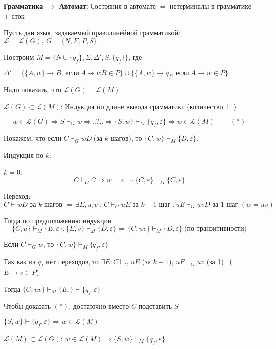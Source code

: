\Proof \textbf{Грамматика $\rightarrow$ Автомат:} Состояния в автомате $=$ нетерминалы в грамматике $+$ сток

Пусть дан язык, задаваемый праволинейной грамматикой: $\mathcal{L} = \mathcal{L}(G),\ G = \{N, \Sigma, P, S\}$

Построим $M = \{N \cup \{q_f\}, \Sigma, \Delta', S, \{q_f\}\}$, где

$\Delta' = \{ \{A, w\} \rightarrow B \text{, если}\ A \rightarrow wB \in P  \} \cup
\{\{A, w\} \rightarrow q_f \text{, если}\ A \rightarrow w \in P \}$

Надо показать, что $\mathcal{L}(G) = \mathcal{L}(M)$

\underline{$\mathcal{L}(G) \subset \mathcal{L}(M)$}:
Индукция по длине вывода грамматики (количество $\vdash$)

$$
w \in \mathcal{L}(G) \Rightarrow 
S \vdash_{G} w  \Rightarrow ..?.. \Rightarrow
\{S, w\} \vdash_{M} \{q_f, \varepsilon\} \Rightarrow
w \in \mathcal{L}(M)\ \qquad  (*)
$$

Покажем, что если $C \vdash_{G} wD$ (за $k$ шагов), 
то $\{C, w\} \vdash_{M} \{D, \varepsilon\}$.

Индукция по $k$:

$k = 0$:
$$
C \vdash_{G} C \Rightarrow 
w = \varepsilon \Rightarrow
\{C, \varepsilon\} \vdash_{M} \{C, \varepsilon\}
$$

Переход:
$$
C \vdash wD \text{ за } k \text{ шагов } \Rightarrow
\exists E, u, v\ :\ C \vdash_{G} uE \text{ за } k - 1 \text{ шаг },
uE \vdash_{G} uvD \text{ за 1 шаг } (w = uv) 
$$

Тогда по предположению индукции
$$
\{C, u\} \vdash_M \{E, \varepsilon\},
\{E, v\} \vdash_M \{D, \varepsilon\} \Rightarrow
\{C, uv\} \vdash_M \{D, \varepsilon\} \text{ (по транзитивности)}
$$

Если $C \vdash_{G} w$, то $\{C, w\} \vdash_{M} \{q_f, \varepsilon\}$

Так как из $q_f$ нет переходов, то $\exists E : C \vdash_{G} uE$ (за $k - 1$),
$uE \vdash_{G} uv$ (за 1) \ ($E \rightarrow v \in P$)

Тогда $\{C, uv\} \vdash_{M} \{E, \} \vdash \{q_f, \varepsilon\}$

Чтобы доказать $(*)$, достаточно вместо $C$ подставить $S$

$\{S, w\} \vdash \{q_f, \varepsilon\} \Rightarrow w \in \mathcal{L}(M)$

\underline{$\mathcal{L}(M) \subset \mathcal{L}(G)$}:
$w \in \mathcal{L}(M) \Rightarrow \{S, w\} \vdash_{M} \{q_f, \varepsilon\}$

